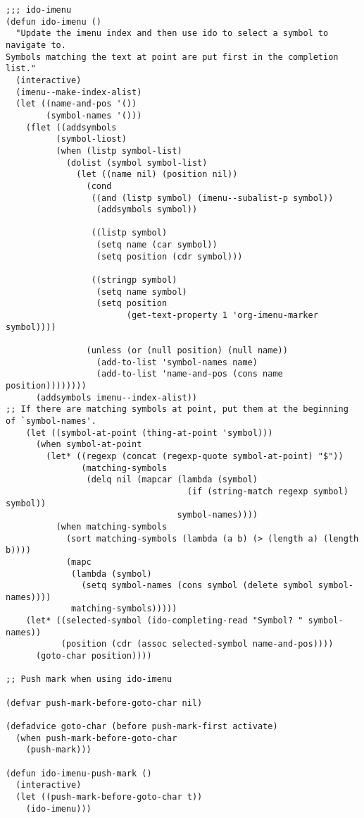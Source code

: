 \documentclass{article}
\begin{document}
\begin{verbatim}
;;; ido-imenu
(defun ido-imenu ()
  "Update the imenu index and then use ido to select a symbol to navigate to.
Symbols matching the text at point are put first in the completion list."
  (interactive)
  (imenu--make-index-alist)
  (let ((name-and-pos '())
        (symbol-names '()))
    (flet ((addsymbols
          (symbol-liost)
          (when (listp symbol-list)
            (dolist (symbol symbol-list)
              (let ((name nil) (position nil))
                (cond
                 ((and (listp symbol) (imenu--subalist-p symbol))
                  (addsymbols symbol))

                 ((listp symbol)
                  (setq name (car symbol))
                  (setq position (cdr symbol)))

                 ((stringp symbol)
                  (setq name symbol)
                  (setq position
                        (get-text-property 1 'org-imenu-marker symbol))))

                (unless (or (null position) (null name))
                  (add-to-list 'symbol-names name)
                  (add-to-list 'name-and-pos (cons name position))))))))
      (addsymbols imenu--index-alist))
;; If there are matching symbols at point, put them at the beginning of `symbol-names'.
    (let ((symbol-at-point (thing-at-point 'symbol)))
      (when symbol-at-point
        (let* ((regexp (concat (regexp-quote symbol-at-point) "$"))
               (matching-symbols
                (delq nil (mapcar (lambda (symbol)
                                    (if (string-match regexp symbol) symbol))
                                  symbol-names))))
          (when matching-symbols
            (sort matching-symbols (lambda (a b) (> (length a) (length b))))
            (mapc
             (lambda (symbol)
               (setq symbol-names (cons symbol (delete symbol symbol-names))))
             matching-symbols)))))
    (let* ((selected-symbol (ido-completing-read "Symbol? " symbol-names))
           (position (cdr (assoc selected-symbol name-and-pos))))
      (goto-char position))))

;; Push mark when using ido-imenu

(defvar push-mark-before-goto-char nil)

(defadvice goto-char (before push-mark-first activate)
  (when push-mark-before-goto-char
    (push-mark)))

(defun ido-imenu-push-mark ()
  (interactive)
  (let ((push-mark-before-goto-char t))
    (ido-imenu)))
\end{verbatim}
\end{document}
